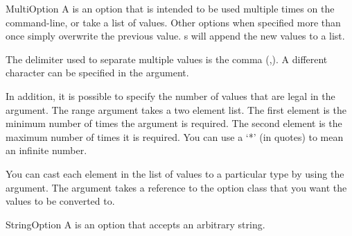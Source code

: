 \begin{classdesc}{MultiOption}{}
A  is an option that is intended to be used multiple times
on the command-line, or take a list of values.  Other options when specified
more than once simply overwrite the previous value.  s
will append the new values to a list.

The delimiter used to separate multiple values is the comma (,).  A different
character can be specified in the  argument.  

In addition, it is possible to specify the number of values that are legal
in the  argument.  The range argument takes a two element list.
The first element is the minimum number of times the argument is required.
The second element is the maximum number of times it is required.  You can
use a `*' (in quotes) to mean an infinite number.

You can cast each element in the list of values to a particular type by
using the  argument.  The  argument takes a
reference to the option class that you want the values to be converted to.
\end{classdesc}

\begin{classdesc}{StringOption}{}
A  is an option that accepts an arbitrary string.
\end{classdesc}
